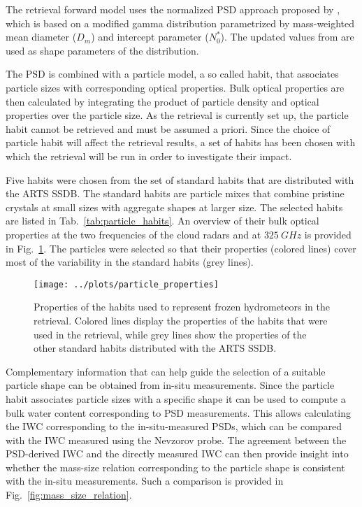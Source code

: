 \documentclass[journal abbreviation, manuscript]{copernicus}
\begin{document}
The retrieval forward model uses the normalized PSD approach proposed by
\citet{delanoe05}, which is based on a modified gamma distribution parametrized
by mass-weighted mean diameter ($D_m$) and intercept parameter ($N_0^*$). The
updated values from \citet{cazenave19} are used as shape parameters of the
distribution.

The PSD is combined with a particle model, a so called habit, that associates
particle sizes with corresponding optical properties. Bulk optical properties
are then calculated by integrating the product of particle density and optical
properties over the particle size. As the retrieval is currently set up, the
particle habit cannot be retrieved and must be assumed a priori. Since the
choice of particle habit will affect the retrieval results, a set of habits has
been chosen with which the retrieval will be run in order to investigate their
impact.

Five habits were chosen from the set of standard habits that are distributed
with the ARTS SSDB. The standard habits are particle mixes that combine pristine
crystals at small sizes with aggregate shapes at larger size. The selected
habits are listed in Tab.~\ref{tab:particle_habits}. An overview of their bulk
optical properties at the two frequencies of the cloud radars and at
$325\ \unit{GHz}$ is provided in Fig.~\ref{fig:particle_properties}. The
particles were selected so that their properties (colored lines) cover most of
the variability in the standard habits (grey lines).

\begin{figure}[hbpt!]
  \centering
  \texttt{[image: ../plots/particle\_properties]}
  \caption{Properties of the habits used to represent frozen hydrometeors
    in the retrieval. Colored lines display the properties of the habits that
    were used in the retrieval, while grey lines show the properties of the
    other standard habits distributed with the ARTS SSDB.
    }
  \label{fig:particle_properties}
\end{figure}

Complementary information that can help guide the selection of a suitable
particle shape can be obtained from in-situ measurements. Since the particle
habit associates particle sizes with a specific shape it can be used to compute
a bulk water content corresponding to PSD measurements. This allows calculating
the IWC corresponding to the in-situ-measured PSDs, which can be compared with
the IWC measured using the Nevzorov probe. The agreement between the PSD-derived
IWC and the directly measured IWC can then provide insight into whether the
mass-size relation corresponding to the particle shape is consistent with the
in-situ measurements. Such a comparison is provided in
Fig.~\ref{fig:mass_size_relation}.
\end{document}
